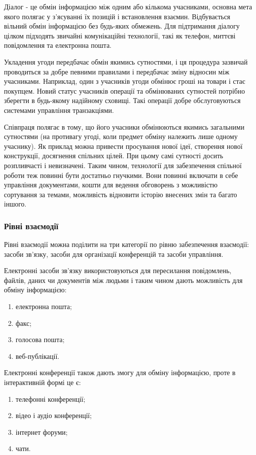 \par Діалог - це обмін інформацією між одним або кількома учасниками, основна мета якого полягає у з'ясуванні їх позицій і встановлення взаємин. 
Відбувається вільний обмін інформацією без будь-яких обмежень. 
Для підтримання діалогу цілком підходять звичайні комунікаційні технології, такі як телефон, миттєві повідомлення та електронна пошта.
\par Укладення угоди передбачає обмін якимись сутностями, і ця процедура зазвичай проводиться за добре певними правилами і передбачає зміну відносин між учасниками. Наприклад, один з учасників угоди обмінює гроші на товари і стає покупцем. Новий статус учасників операції та обмінюваних сутностей потрібно зберегти в будь-якому надійному сховищі. Такі операції добре обслуговуються системами управління транзакціями. 
\par Співпраця полягає в тому, що його учасники обмінюються якимись загальними сутностями (на противагу угоді, коли предмет обміну належить лише одному учаснику). 
Як приклад можна привести просування нової ідеї, створення нової конструкції, досягнення спільних цілей. 
При цьому самі сутності досить розпливчасті і невизначені. 
Таким чином, технології для забезпечення спільної роботи теж повинні бути достатньо гнучкими. 
Вони повинні включати в себе управління документами, кошти для ведення обговорень з можливістю сортування за темами, можливість відновити історію внесених змін та багато іншого.
 
\subsubsection{Рівні взаємодії}

Рівні взаємодії можна поділити на три категорії по рівню забезпечення взаємодії: засоби зв'язку, засоби для організації конференцій та засоби управління.

\par Електронні засоби зв'язку використовуються для пересилання повідомлень, файлів, даних чи документів між людьми і таким чином дають можливість для обміну інформацією:
\begin{enumerate}
\item електронна пошта;
\item факс;
\item голосова пошта;
\item веб-публікації.
\end{enumerate}

Електронні конференції також дають змогу для обміну інформацією, проте в інтерактивній формі це є:
\begin{enumerate}
\item телефонні конференції;
\item відео і аудіо конференції;
\item інтернет форуми;
\item чати.
\end{enumerate}

